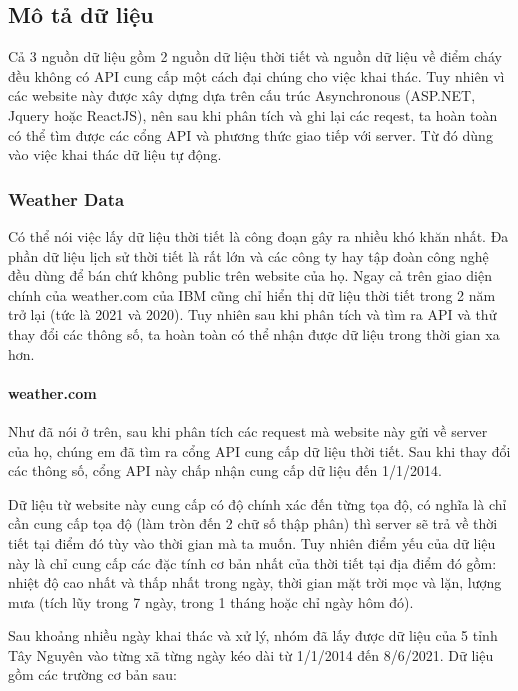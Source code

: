 \documentclass{article}
\begin{document}
\subsection{Mô tả dữ liệu}
\qquad Cả 3 nguồn dữ liệu gồm 2 nguồn dữ liệu thời tiết và nguồn dữ liệu về điểm cháy đều không có API cung cấp một cách đại chúng cho việc khai thác. Tuy nhiên vì các website này được xây dựng dựa trên cấu trúc Asynchronous (ASP.NET, Jquery hoặc ReactJS), nên sau khi phân tích và ghi lại các reqest, ta hoàn toàn có thể tìm được các cổng API và phương thức giao tiếp với server. Từ đó dùng vào việc khai thác dữ liệu tự động.

\subsubsection{Weather Data}

\qquad Có thể nói việc lấy dữ liệu thời tiết là công đoạn gây ra nhiều khó khăn nhất. Đa phần dữ liệu lịch sử thời tiết là rất lớn và các công ty hay tập đoàn công nghệ đều dùng để bán chứ không public trên website của họ. Ngay cả trên giao diện chính của weather.com của IBM cũng chỉ hiển thị dữ liệu thời tiết trong 2 năm trở lại (tức là 2021 và 2020). Tuy nhiên sau khi phân tích và tìm ra API và thử thay đổi các thông số, ta hoàn toàn có thể nhận được dữ liệu trong thời gian xa hơn.

\paragraph{weather.com}
Như đã nói ở trên, sau khi phân tích các request mà website này gửi về server của họ, chúng em đã tìm ra cổng API cung cấp dữ liệu thời tiết. Sau khi thay đổi các thông số, cổng API này chấp nhận cung cấp dữ liệu đến 1/1/2014.

Dữ liệu từ website này cung cấp có độ chính xác đến từng tọa độ, có nghĩa là chỉ cần cung cấp tọa độ (làm tròn đến 2 chữ số thập phân) thì server sẽ trả về thời tiết tại điểm đó tùy vào thời gian mà ta muốn. Tuy nhiên điểm yếu của dữ liệu này là chỉ cung cấp các đặc tính cơ bản nhất của thời tiết tại địa điểm đó gồm: nhiệt độ cao nhất và thấp nhất trong ngày, thời gian mặt trời mọc và lặn, lượng mưa (tích lũy trong 7 ngày, trong 1 tháng hoặc chỉ ngày hôm đó).

Sau khoảng nhiều ngày khai thác và xử lý, nhóm đã lấy được dữ liệu của 5 tỉnh Tây Nguyên vào từng xã từng ngày kéo dài từ 1/1/2014 đến 8/6/2021. Dữ liệu gồm các trường cơ bản sau:
\end{document}
